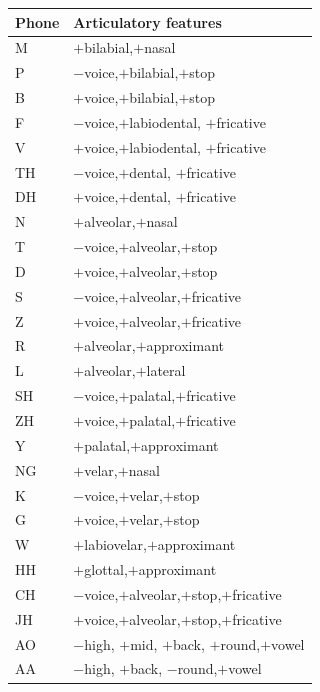 \documentclass{article}
\begin{document}
\begin{table}[h!]
\centering
\begin{tabular}{|p{}|p{}|} 
 \hline
 \textbf{Phone} & \textbf{Articulatory features} \\ \hline 
    M & $+$bilabial,$+$nasal \\ \hline
    P & $-$voice,$+$bilabial,$+$stop \\ \hline
    B & $+$voice,$+$bilabial,$+$stop \\ \hline
    F & $-$voice,$+$labiodental, $+$fricative \\ \hline
    V & $+$voice,$+$labiodental,
    $+$fricative \\ \hline
    TH & $-$voice,$+$dental,
    $+$fricative \\ \hline
    DH & $+$voice,$+$dental,
    $+$fricative \\ \hline
    N & $+$alveolar,$+$nasal \\ \hline
    T & $-$voice,$+$alveolar,$+$stop \\ \hline
    D & $+$voice,$+$alveolar,$+$stop \\ \hline
    S & $-$voice,$+$alveolar,$+$fricative \\ \hline
    Z & $+$voice,$+$alveolar,$+$fricative \\ \hline
    R & $+$alveolar,$+$approximant \\ \hline
    L & $+$alveolar,$+$lateral \\ \hline
    SH & $-$voice,$+$palatal,$+$fricative \\ \hline
    ZH & $+$voice,$+$palatal,$+$fricative \\ \hline
    Y & $+$palatal,$+$approximant \\ \hline
    NG & $+$velar,$+$nasal \\ \hline
    K & $-$voice,$+$velar,$+$stop \\ \hline
    G & $+$voice,$+$velar,$+$stop  \\ \hline
    W & $+$labiovelar,$+$approximant \\ \hline
    HH & $+$glottal,$+$approximant \\ \hline
    CH & $-$voice,$+$alveolar,$+$stop,$+$fricative \\ \hline
    JH &  $+$voice,$+$alveolar,$+$stop,$+$fricative \\ \hline
    AO & $-$high, $+$mid, $+$back,  $+$round,$+$vowel \\ \hline
    AA & $-$high, $+$back, $-$round,$+$vowel \\ \hline

\end{tabular}
\end{table}
\end{document}
